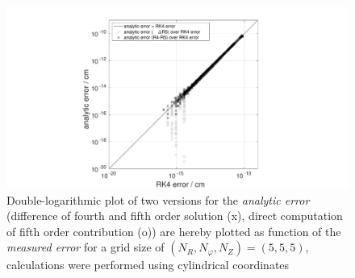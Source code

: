\documentclass[./main.tex]{subfiles}
\begin{document}
\begin{figure}[H]
\centering
\vspace{-0.5cm}
	\includegraphics[width=1.2\textwidth]{figures/RK4_alpha555_cyl.pdf}
		\caption{Double-logarithmic plot of two versions for the \textit{analytic error} (difference of fourth and fifth order solution (x), direct computation of fifth order contribution (o)) are hereby plotted as function of the \textit{measured error} for a grid size of $(N_R,N_\varphi,N_Z) = (5,5,5)$, calculations were performed using cylindrical coordinates}  
	\label{fig:RK4_alpha555_cyl}

\vspace{-0.5cm}
 \hfill%
\end{figure}
\end{document}
